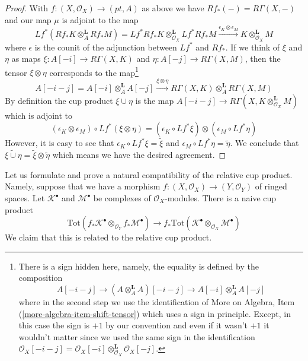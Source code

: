 \begin{proof}
With $f : (X, \mathcal{O}_X) \to (pt, A)$ as above we have
$Rf_*(-) = R\Gamma(X, -)$ and our map $\mu$ is adjoint to the map
$$
Lf^*(Rf_*K \otimes_A^\mathbf{L} Rf_*M) =
Lf^*Rf_*K \otimes_{\mathcal{O}_X}^\mathbf{L} Lf^*Rf_*M
\xrightarrow{\epsilon_K \otimes \epsilon_M}
K \otimes_{\mathcal{O}_X}^\mathbf{L} M
$$
where $\epsilon$ is the counit of the adjunction between
$Lf^*$ and $Rf_*$.
If we think of $\xi$ and $\eta$ as maps $\xi : A[-i] \to R\Gamma(X, K)$
and $\eta : A[-j] \to R\Gamma(X, M)$, then
the tensor $\xi \otimes \eta$ corresponds to the map\footnote{There
is a sign hidden here, namely, the equality is defined by
the composition
$$
A[-i - j] \to (A \otimes_A^\mathbf{L} A)[-i - j] \to
A[-i] \otimes_A^\mathbf{L} A[-j]
$$
where in the second step we use the identification of
More on Algebra, Item (\ref{more-algebra-item-shift-tensor})
which uses a sign in principle.
Except, in this case the sign is $+1$ by our convention and even if it wasn't
$+1$ it wouldn't matter since we used the same sign
in the identification
$\mathcal{O}_X[-i - j] =
\mathcal{O}_X[-i] \otimes_{\mathcal{O}_X}^\mathbf{L} \mathcal{O}_X[-j]$.}
$$
A[-i - j] = A[-i] \otimes_A^\mathbf{L} A[-j]
\xrightarrow{\xi \otimes \eta}
R\Gamma(X, K) \otimes_A^\mathbf{L} R\Gamma(X, M)
$$
By definition the cup product $\xi \cup \eta$ is the map
$A[-i - j] \to R\Gamma(X, K \otimes_{\mathcal{O}_X}^\mathbf{L} M)$
which is adjoint to
$$
(\epsilon_K \otimes \epsilon_M) \circ Lf^*(\xi \otimes \eta) =
(\epsilon_K \circ Lf^*\xi) \otimes (\epsilon_M \circ Lf^*\eta)
$$
However, it is easy to see that
$\epsilon_K \circ Lf^*\xi = \tilde \xi$ and
$\epsilon_M \circ Lf^*\eta = \tilde \eta$.
We conclude that $\widetilde{\xi \cup \eta} = \tilde \xi \otimes \tilde \eta$
which means we have the desired agreement.
\end{proof}

\noindent
Let us formulate and prove a natural compatibility of the
relative cup product. Namely, suppose that we have a morphism
$f : (X, \mathcal{O}_X) \to (Y, \mathcal{O}_Y)$ of ringed spaces.
Let $\mathcal{K}^\bullet$ and $\mathcal{M}^\bullet$
be complexes of $\mathcal{O}_X$-modules.
There is a naive cup product
$$
\text{Tot}(
f_*\mathcal{K}^\bullet
\otimes_{\mathcal{O}_Y}
f_*\mathcal{M}^\bullet)
\longrightarrow
f_*\text{Tot}(\mathcal{K}^\bullet
\otimes_{\mathcal{O}_X}
\mathcal{M}^\bullet)
$$
We claim that this is related to the relative cup product.

